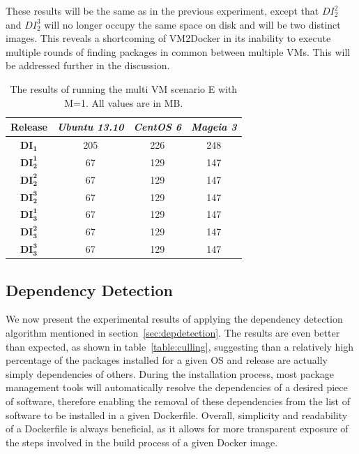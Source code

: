 \begin{enumerate}
These results will be the same as in the previous experiment, except that $DI_2^2$ and $DI_2^3$ will no longer occupy the same space on disk and will be two distinct images. This reveals a shortcoming of VM2Docker in its inability to execute multiple rounds of finding packages in common between multiple VMs. This will be addressed further in the discussion.
\begin{table}[h]
\centering

    \begin{tabular}{| c | c | c | c|}
    \hline
    \bfseries Release & \itshape Ubuntu 13.10 & \itshape CentOS 6 & \itshape Mageia 3\\ \hline
    \bfseries $\boldsymbol{DI_1}$ & 205 & 226 & 248\\ \hline
    \bfseries $\boldsymbol{DI_2^1}$ & 67 & 129 & 147\\ \hline 
\bfseries $\boldsymbol{DI_2^2}$ & 67 & 129 & 147\\ \hline 
\bfseries $\boldsymbol{DI_2^3}$ & 67 & 129 & 147\\ \hline 
\bfseries $\boldsymbol{DI_3^1}$  & 67 & 129 & 147\\ \hline 
\bfseries $\boldsymbol{DI_3^2}$ & 67 & 129 & 147\\ \hline 
\bfseries $\boldsymbol{DI_3^3}$ & 67 & 129 & 147\\ \hline 
    \end{tabular}
\caption{The results of running the multi VM scenario E with M=1. All values are in MB.}
\label{table:multiscenarioe}
\end{table}

\end{enumerate}




\subsection{Dependency Detection}
We now present the experimental results of applying the dependency detection algorithm mentioned in section~\ref{sec:depdetection}. The results are even better than expected, as shown in table~\ref{table:culling}, suggesting than a relatively high percentage of the packages installed for a given OS and release are actually simply dependencies of others. During the installation process, most package management tools will automatically resolve the dependencies of a desired piece of software, therefore enabling the removal of these dependencies from the list of software to be installed in a given Dockerfile. Overall, simplicity and readability of a Dockerfile is always beneficial, as it allows for more transparent exposure of the steps involved in the build process of a given Docker image.

